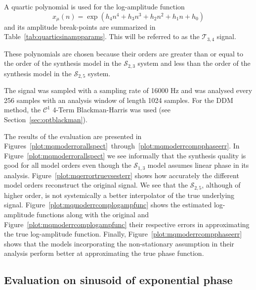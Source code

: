A quartic polynomial is used for the log-amplitude function
\[
    x_{\mu}(n) = \exp \left(h_4 n^{4} + h_3 n^{3} + h_2 n^{2} + h_1 n + h_0 \right)
\]
and its amplitude break-points are summarized in
Table~\ref{tab:quarticsinampparams}. This will be referred to as the
$\mathscr{T}_{3,4}$ signal.

These polynomials are chosen because their orders are greater than or equal to
the order of the synthesis model in the $\mathscr{S}_{2,3}$ system and less than
the order of the synthesis model in the $\mathscr{S}_{2,5}$ system.

The signal was sampled with a sampling rate of 16000 Hz and was analysed every
256 samples with an analysis window of length 1024 samples. For the DDM method, the
$\mathcal{C}^{1}$ 4-Term Blackman-Harris was used (see
Section~\ref{sec:optblackman}).

The results of the evaluation are presented in
Figures~\ref{plot:mqmoderrorallspect}~through~\ref{plot:mqmoderrcompphaseerr}.
In Figure~\ref{plot:mqmoderrorallspect} we see informally that the synthesis
quality is good for all model orders even though the $\mathscr{S}_{1,3}$ model
assumes linear phase in its analysis. Figure~\ref{plot:mqerrortruevsesterr}
shows how accurately the different model orders reconstruct the original signal.
We see that the $\mathscr{S}_{2,5}$, although of higher order, is not systemically a
better interpolator of the true underlying signal.
Figure~\ref{plot:mqmoderrcomplogampfunc} shows the estimated log-amplitude functions
along with the original and Figure~\ref{plot:mqmoderrcomplogampfunc} their
respective errors in approximating the true log-amplitude function.  Finally,
Figure~\ref{plot:mqmoderrcompphaseerr} shows that the models incorporating the
non-stationary assumption in their analysis perform better at approximating the
true phase function. 


\subsection{Evaluation on sinusoid of exponential phase \label{sec:evalexpphase}}

